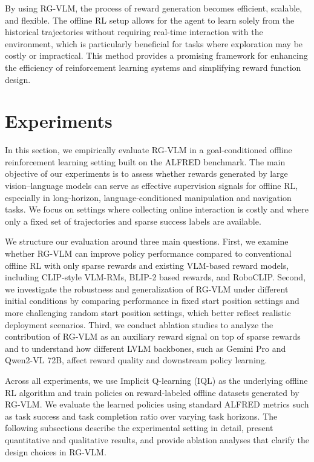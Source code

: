 \documentclass[master,english,final]{kaist-ucs}
\begin{document}
By using RG-VLM, the process of reward generation becomes efficient, scalable, and flexible. The offline RL setup allows for the agent to learn solely from the historical trajectories without requiring real-time interaction with the environment, which is particularly beneficial for tasks where exploration may be costly or impractical. This method provides a promising framework for enhancing the efficiency of reinforcement learning systems and simplifying reward function design.


\chapter{Experiments}
In this section, we empirically evaluate RG-VLM in a goal-conditioned offline reinforcement learning setting built on the ALFRED benchmark. The main objective of our experiments is to assess whether rewards generated by large vision–language models can serve as effective supervision signals for offline RL, especially in long-horizon, language-conditioned manipulation and navigation tasks. We focus on settings where collecting online interaction is costly and where only a fixed set of trajectories and sparse success labels are available.

We structure our evaluation around three main questions. First, we examine whether RG-VLM can improve policy performance compared to conventional offline RL with only sparse rewards and existing VLM-based reward models, including CLIP-style VLM-RMs\cite{rocamonde2023vision}, BLIP-2\cite{li2022blip} based rewards, and RoboCLIP\cite{sontakke2024roboclip}. Second, we investigate the robustness and generalization of RG-VLM under different initial conditions by comparing performance in fixed start position settings and more challenging random start position settings, which better reflect realistic deployment scenarios. Third, we conduct ablation studies to analyze the contribution of RG-VLM as an auxiliary reward signal on top of sparse rewards and to understand how different LVLM backbones, such as Gemini Pro\cite{reid2024gemini} and Qwen2-VL 72B, affect reward quality and downstream policy learning.

Across all experiments, we use Implicit Q-learning (IQL)\cite{wang2023implicit} as the underlying offline RL algorithm and train policies on reward-labeled offline datasets generated by RG-VLM. We evaluate the learned policies using standard ALFRED metrics such as task success and task completion ratio over varying task horizons. The following subsections describe the experimental setting in detail, present quantitative and qualitative results, and provide ablation analyses that clarify the design choices in RG-VLM.
\end{document}
